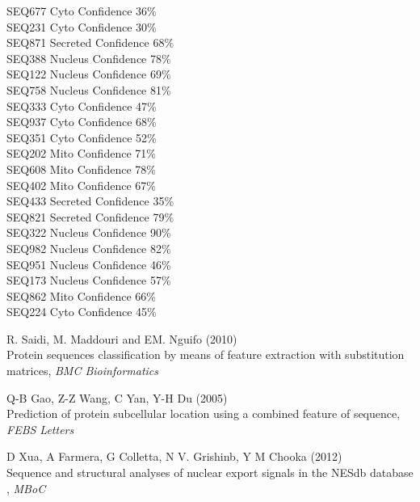 \documentclass{bioinfo}
\begin{document}
\begin{methods}
\begin{minipage}{\linewidth}
SEQ677 Cyto Confidence 36\% \\
SEQ231 Cyto Confidence 30\% \\
SEQ871 Secreted Confidence 68\% \\
SEQ388 Nucleus Confidence 78\% \\
SEQ122 Nucleus Confidence 69\% \\
SEQ758 Nucleus Confidence 81\% \\
SEQ333 Cyto Confidence 47\% \\
SEQ937 Cyto Confidence 68\% \\
SEQ351 Cyto Confidence 52\% \\
SEQ202 Mito Confidence 71\% \\
SEQ608 Mito Confidence 78\% \\
SEQ402 Mito Confidence 67\% \\
SEQ433 Secreted Confidence 35\% \\
SEQ821 Secreted Confidence 79\% \\
SEQ322 Nucleus Confidence 90\% \\
SEQ982 Nucleus Confidence 82\% \\
SEQ951 Nucleus Confidence 46\% \\
SEQ173 Nucleus Confidence 57\% \\
SEQ862 Mito Confidence 66\% \\
SEQ224 Cyto Confidence 45\% \\
\end{minipage}
\end{methods}

\begin{thebibliography}{}

R. Saidi, M. Maddouri and EM. Nguifo (2010) \\
Protein sequences classification by means of feature extraction with substitution matrices, {\it BMC Bioinformatics}

Q-B Gao, Z-Z Wang, C Yan, Y-H Du (2005)\\ 
Prediction of protein subcellular location using a combined feature of sequence, {\it FEBS Letters}

D Xua, A Farmera, G Colletta, N V. Grishinb, Y M Chooka (2012)\\
Sequence and structural analyses of nuclear export signals in the NESdb database , {\it MBoC}

\end{thebibliography}
\end{document}
